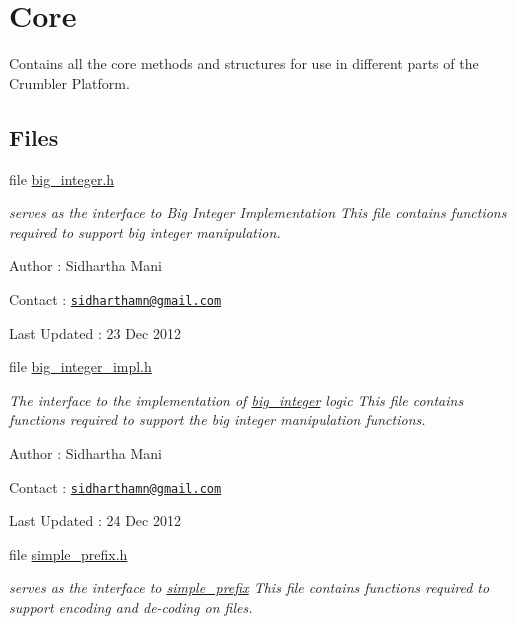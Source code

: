 \hypertarget{group__core}{\section{Core}
\label{group__core}
}


Contains all the core methods and structures for use in different parts of the Crumbler Platform.  


\subsection*{Files}
\begin{DoxyCompactItemize}
\item 
file \hyperlink{big__integer_8h}{big\-\_\-integer.\-h}
\begin{DoxyCompactList}\small\item\em serves as the interface to Big Integer Implementation This file contains functions required to support big integer manipulation.\par
 Author \-: Sidhartha Mani\par
 Contact \-: \href{mailto:sidharthamn@gmail.com}{\tt sidharthamn@gmail.\-com} \par
 Last Updated \-: 23 Dec 2012 \par
 \end{DoxyCompactList}\item 
file \hyperlink{big__integer__impl_8h}{big\-\_\-integer\-\_\-impl.\-h}
\begin{DoxyCompactList}\small\item\em The interface to the implementation of \hyperlink{big__integer__impl_8h_structbig__integer}{big\-\_\-integer} logic This file contains functions required to support the big integer manipulation functions.\par
 Author \-: Sidhartha Mani\par
 Contact \-: \href{mailto:sidharthamn@gmail.com}{\tt sidharthamn@gmail.\-com} \par
 Last Updated \-: 24 Dec 2012 \par
 \end{DoxyCompactList}\item 
file \hyperlink{simple__prefix_8h}{simple\-\_\-prefix.\-h}
\begin{DoxyCompactList}\small\item\em serves as the interface to \hyperlink{structsimple__prefix}{simple\-\_\-prefix} This file contains functions required to support encoding and de-\/coding on files.\par

\end{DoxyCompactList}
\end{DoxyCompactItemize}
